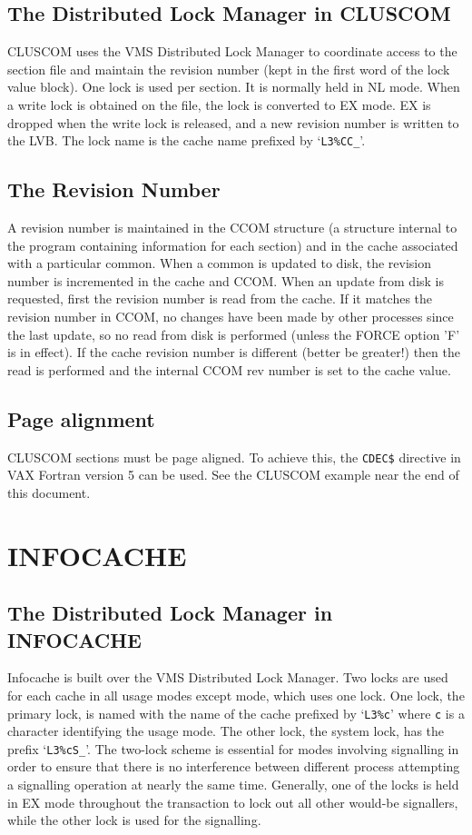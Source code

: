 \subsection{The Distributed Lock Manager in CLUSCOM}
CLUSCOM uses the VMS Distributed Lock Manager to coordinate access
to the section file and maintain the revision number (kept in the first
word of the lock value block). One lock is used per section. It is
normally held in NL mode. When a write lock is obtained on the file,
the lock is converted to EX mode. EX is dropped when the write lock is
released, and a new revision number is written to the LVB.
The lock name is the cache name prefixed by `\verb|L3%CC_|'.


\subsection{The Revision Number}
A revision number is maintained in the CCOM structure
(a structure internal to the program containing information for each
section) and in the cache
associated with a particular common. When a common is updated to disk,
the revision number is incremented in the cache and CCOM. When an update
from disk is requested, first the revision number is read from the cache.
If it matches the revision number in CCOM, no changes have been made by
other processes since the last update, so no read from disk is performed
(unless the FORCE option 'F' is in effect). If the cache revision number
is different (better be greater!) then the read is performed and the internal
CCOM rev number is set to the cache value.

\subsection{Page alignment}
CLUSCOM sections must be page aligned. To achieve this, the \verb|CDEC$|
directive in VAX Fortran version 5 can be used. See the CLUSCOM example
near the end of this document.

\section{INFOCACHE}


\subsection{The Distributed Lock Manager in INFOCACHE}
Infocache is built over the VMS Distributed Lock Manager.
Two locks are used for each cache in all usage modes except \info
mode, which uses one lock. One lock, the primary lock, is named
with the name of the cache prefixed by `\verb|L3%c|' where {\tt c} is
a character identifying the usage mode. The other lock, the system
lock, has the prefix `\verb|L3%cS_|'. The two-lock scheme is essential
for modes involving signalling in order to ensure that there is no
interference between different process attempting a signalling
operation at nearly the same time. Generally, one of the locks is
held in EX mode throughout the transaction to lock out all other
would-be signallers, while the other lock is used for the signalling.

